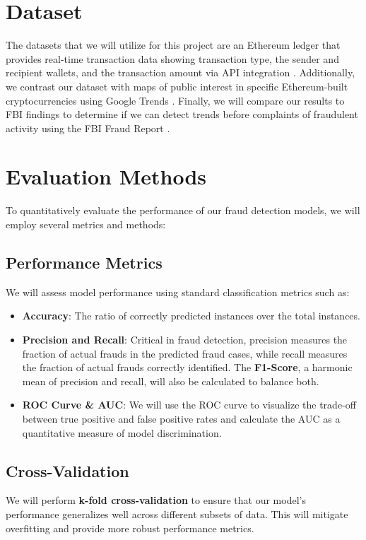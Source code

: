 \documentclass[sigconf]{acmart}
\begin{document}
\section{Dataset}

The datasets that we will utilize for this project are an Ethereum ledger that provides real-time transaction data showing transaction type, the sender and recipient wallets, and the transaction amount via API integration \cite{etherscan}. Additionally, we contrast our dataset with maps of public interest in specific Ethereum-built cryptocurrencies using Google Trends \cite{googletrends}. Finally, we will compare our results to FBI findings to determine if we can detect trends before complaints of fraudulent activity using the FBI Fraud Report \cite{FBIFraudReport2023}.

\section{Evaluation Methods}

To quantitatively evaluate the performance of our fraud detection models, we will employ several metrics and methods:

\subsection{Performance Metrics}
We will assess model performance using standard classification metrics such as:
\begin{itemize}
    \item \textbf{Accuracy}: The ratio of correctly predicted instances over the total instances.
    \item \textbf{Precision and Recall}: Critical in fraud detection, precision measures the fraction of actual frauds in the predicted fraud cases, while recall measures the fraction of actual frauds correctly identified. The \textbf{F1-Score}, a harmonic mean of precision and recall, will also be calculated to balance both.
    \item \textbf{ROC Curve \& AUC}: We will use the ROC curve to visualize the trade-off between true positive and false positive rates and calculate the AUC as a quantitative measure of model discrimination.
\end{itemize}

\subsection{Cross-Validation}
We will perform \textbf{k-fold cross-validation} to ensure that our model's performance generalizes well across different subsets of data. This will mitigate overfitting and provide more robust performance metrics.
\end{document}

